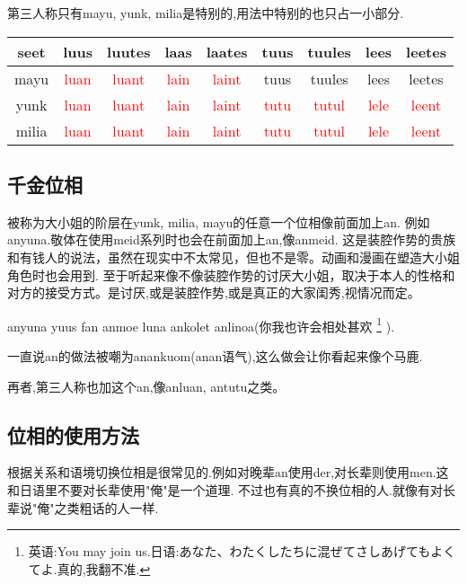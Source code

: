 第三人称只有mayu, yunk, milia是特别的,用法中特别的也只占一小部分.
\begin{table}[H]
    \begin{tabular}{|c|c|c|c|c|c|c|c|c|} %
    \hline
    seet&  luus&  luutes&  laas&  laates&  tuus&  tuules&  lees&  leetes\\\hline
     mayu&  \textcolor{red}{luan}&  \textcolor{red}{luant}&  \textcolor{red}{lain}&  \textcolor{red}{laint}&  tuus&  tuules&  lees&  leetes\\\hline
     yunk&  \textcolor{red}{luan}&  \textcolor{red}{luant}&  \textcolor{red}{lain}&  \textcolor{red}{laint}&  \textcolor{red}{tutu}&  \textcolor{red}{tutul}&  \textcolor{red}{lele}&  \textcolor{red}{leent}\\\hline
     milia&   \textcolor{red}{luan}&  \textcolor{red}{luant}&  \textcolor{red}{lain}&  \textcolor{red}{laint}&  \textcolor{red}{tutu}&  \textcolor{red}{tutul}&  \textcolor{red}{lele}&  \textcolor{red}{leent}\\\hline

  \end{tabular}
\end{table}

\subsection{千金位相}

被称为大小姐的阶层在yunk, milia, mayu的任意一个位相像前面加上an.
例如anyuna.敬体在使用meid系列时也会在前面加上an,像anmeid.
这是装腔作势的贵族和有钱人的说法，虽然在现实中不太常见，但也不是零。动画和漫画在塑造大小姐角色时也会用到.
至于听起来像不像装腔作势的讨厌大小姐，取决于本人的性格和对方的接受方式。是讨厌,或是装腔作势,或是真正的大家闺秀,视情况而定。

anyuna yuus fan anmoe luna ankolet anlinoa(你我也许会相处甚欢
\footnote{英语:You may join us.日语:あなた、わたくしたちに混ぜてさしあげてもよくてよ.真的,我翻不准.
}
).

一直说an的做法被嘲为anankuom(anan语气),这么做会让你看起来像个马鹿.

再者,第三人称也加这个an,像anluan, antutu之类。

\subsection{位相的使用方法}


根据关系和语境切换位相是很常见的.例如对晚辈an使用der,对长辈则使用men.这和日语里不要对长辈使用"俺"是一个道理.
不过也有真的不换位相的人.就像有对长辈说"俺"之类粗话的人一样.

